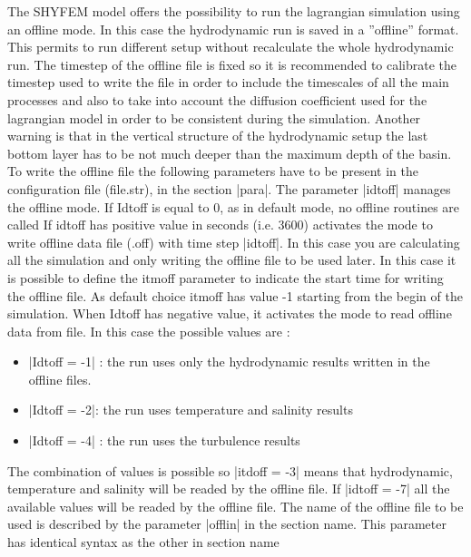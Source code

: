 The SHYFEM model offers the possibility to run the lagrangian simulation using an offline mode. In this case the hydrodynamic run  is saved in a  ''offline'' format. This permits to run different setup without recalculate the whole hydrodynamic run. The timestep of  the offline file is fixed so it is recommended to calibrate the timestep used to write the file in order to include the timescales of all  the main processes and also to take into  account the diffusion coefficient used for  the lagrangian model in order to be consistent during the simulation. Another warning is that in the  vertical  structure of the hydrodynamic setup the last bottom layer has to be not much deeper than the maximum depth of the basin.
To write the offline file the following parameters have to be present in the configuration file (file.str), in the section |para|. The parameter |idtoff| manages the offline mode. If Idtoff is equal to 0, as in  default mode,  no offline routines are called
If idtoff has  positive value in seconds (i.e. 3600) activates the mode to write offline data file (.off) with time step |idtoff|.  In this case you are calculating all the simulation and only writing the offline file to  be used later.
In this case it is possible to  define the itmoff parameter to indicate the start time for writing the offline file. As default choice itmoff has value -1 starting from the begin of  the simulation.
When Idtoff has negative value, it activates the mode to read offline data from file. In this case the possible values are :
\begin{itemize}
\item |Idtoff = -1| : the run uses only the hydrodynamic  results written in the offline files. 
\item |Idtoff = -2|: the run uses temperature and salinity results
\item |Idtoff = -4| : the run uses the turbulence results
\end{itemize}
The combination of values is possible so |itdoff = -3| means that hydrodynamic, temperature and salinity will be readed by the offline file. If |idtoff = -7| all  the available  values will be readed by the offline file. 
The name of the offline file to be used  is  described  by the parameter |offlin| in the section name. This parameter has identical syntax as the other in section name 
